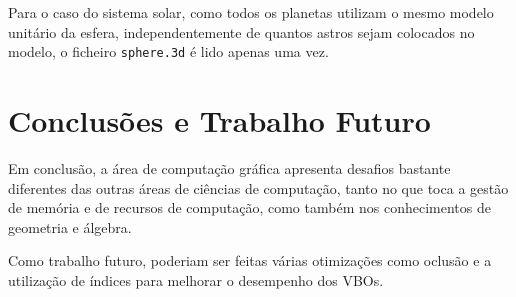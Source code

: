 \documentclass[a4paper]{article}
\begin{document}
Para o caso do sistema solar, como todos os planetas utilizam o mesmo modelo
unitário da esfera, independentemente de quantos astros sejam colocados no
modelo, o ficheiro \texttt{sphere.3d} é lido apenas uma vez.

\section{Conclusões e Trabalho Futuro}

Em conclusão, a área de computação gráfica apresenta desafios bastante
diferentes das outras áreas de ciências de computação, tanto no que toca a
gestão de memória e de recursos de computação, como também nos conhecimentos de
geometria e álgebra.

Como trabalho futuro, poderiam ser feitas várias otimizações como oclusão e a
utilização de índices para melhorar o desempenho dos VBOs.
\end{document}
